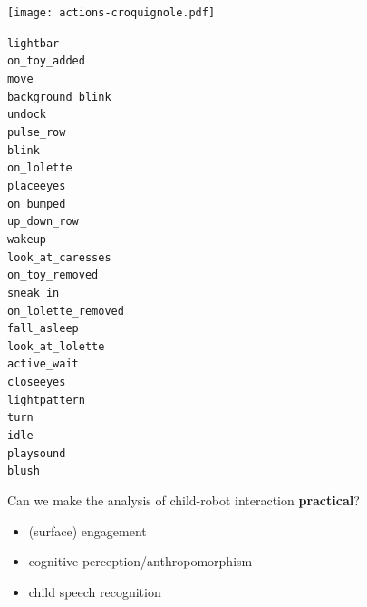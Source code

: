 \documentclass[compress]{beamer}
\begin{document}
{
\begin{frame}{}
    \centering
    \texttt{[image: actions-croquignole.pdf]}

    \begin{multicols}{3}
\scriptsize
{\tt lightbar} \\
{\tt on\_toy\_added} \\
{\tt move} \\
{\tt background\_blink} \\
{\tt undock} \\
{\tt pulse\_row} \\
{\tt blink} \\
{\tt on\_lolette} \\
{\tt placeeyes} \\
{\tt on\_bumped} \\
{\tt up\_down\_row} \\
{\tt wakeup} \\
{\tt look\_at\_caresses} \\
{\tt on\_toy\_removed} \\
{\tt sneak\_in} \\
{\tt on\_lolette\_removed} \\
{\tt fall\_asleep} \\
{\tt look\_at\_lolette} \\
{\tt active\_wait} \\
{\tt closeeyes} \\
{\tt lightpattern} \\
{\tt turn} \\
{\tt idle} \\
{\tt playsound} \\
{\tt blush}

    \end{multicols}
\end{frame}
}


\begin{frame}{}

    \begin{center}

        Can we make the analysis of child-robot interaction {\bf practical}?

        \begin{itemize}
            \item (surface) engagement
            \item cognitive perception/anthropomorphism
            \item child speech recognition
        \end{itemize}

    \end{center}

\end{frame}
\end{document}
